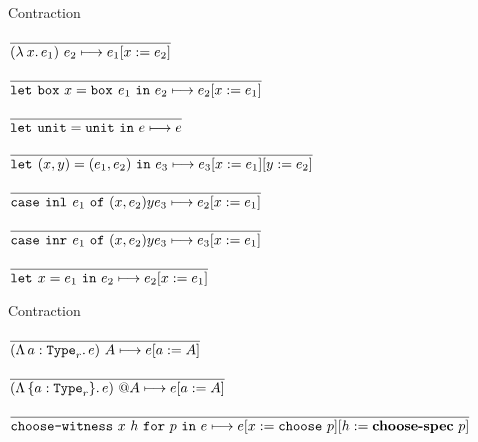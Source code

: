 
\begin{frame}{Contraction}

\begin{center}
  $\infrule{}{\contraction{\app{(\fun{x}{e_1})}{e_2}}{\subst{e_1}{x}{e_2}}}$

  \vspace{1em}

  $\infrule{}{\contraction{\boxelim{x}{\boxintro{e_1}}{e_2}}{\subst{e_2}{x}{e_1}}}$

  \vspace{1em}

  $\infrule{}{\contraction{\unitelim{\unit}{e}}{e}}$

  \vspace{1em}

  $\infrule{}{\contraction{\letpair{x}{y}{\pair{e_1}{e_2}}{e_3}}{\subst{\subst{e_3}{x}{e_1}}{y}{e_2}}}$

  \vspace{1em}

  $\infrule{}{\contraction{\case{\inl{e_1}}{x}{e_2}{y}{e_3}}{\subst{e_2}{x}{e_1}}}$

  \vspace{1em}

  $\infrule{}{\contraction{\case{\inr{e_1}}{x}{e_2}{y}{e_3}}{\subst{e_3}{x}{e_1}}}$

  \vspace{1em}

  $\infrule{}{\contraction{\letin{x}{e_1}{e_2}}{\subst{e_2}{x}{e_1}}}$
\end{center}

\end{frame}

\begin{frame}{Contraction}

\begin{center}
  $\infrule{}{\contraction{\tapp{(\tfun{a}[r]{e})}{A}}{\subst{e}{a}{A}}}$

  \vspace{1em}

  $\infrule{}{\contraction{\itapp{(\itfun{a}[r]{e})}{A}}{\subst{e}{a}{A}}}$

  \vspace{1em}

  $\infrule{}{\contraction{\choosewitnessp{x}{h}{p}{e}}{\subst{\subst{e}{x}{\choose{p}}}{h}{\choosespec{p}}}}$
\end{center}

\end{frame}

